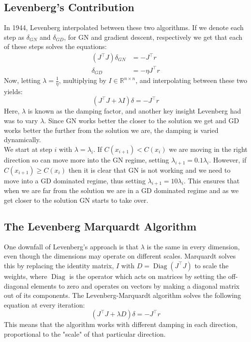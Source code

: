 \subsection{Levenberg's Contribution}\label{sec:background-lm}
In 1944, Levenberg \cite{levenberg1944} interpolated between these two algorithms. If we denote each step as $\delta_{GN}$ and $\delta_{GD}$, for GN and gradient descent, respectively we get that each of these steps solves the equations:
\begin{align}
  (J^\top J) \delta_{GN} &= - J^\top r \\
  \delta_{GD} &= -\eta J^\top r
\end{align}
Now, letting $\lambda = \frac{1}{\eta}$, multiplying by $I \in \mathbb{R}^{n \times n}$, and interpolating between these two yields:
\begin{equation}
  \label{eq:levenberg}
  \left(J^\top J + \lambda I \right)\delta = -J^\top r
\end{equation}
Here, $\lambda$ is known as the damping factor, and another key insight Levenberg had was to vary $\lambda$. Since GN works better the closer to the solution we get and GD works better the further from the solution we are, the damping is varied dynamically.\\
We start at step $i$ with $\lambda = \lambda_i$. If $C(x_{i+1}) < C(x_i)$ we are moving in the right direction so can move more into the GN regime, setting $\lambda_{i+1} = 0.1\lambda_i$. However, if $C(x_{i+1}) \geq C(x_{i})$ then it is clear that GN is not working and we need to move into a GD dominated regime, thus setting $\lambda_{i+1} = 10\lambda_{i}$. This ensures that when we are far from the solution we are in a GD dominated regime and as we get closer to the solution GN starts to take over.

\subsection{The Levenberg Marquardt Algorithm} 
One downfall of Levenberg's approach is that $\lambda$ is the same in every dimension, even though the dimensions may operate on different scales. Marquardt \cite{marquardt1963} solves this by replacing the identity matrix, $I$ with  $D = \operatorname{Diag}\left(J^\top J\right)$ to scale the weights, where $\operatorname{Diag}$ is the operator which acts on matrices by setting the off-diagonal elements to zero and operates on vectors by making a diagonal matrix out of its components. The Levenberg-Marquardt algorithm solves the following equation at every iteration:
\begin{equation}
  \label{eq:lm}
  \left(J^{\top}J + \lambda D \right)\delta = -J^{\top} r 
\end{equation}
This means that the algorithm works with different damping in each direction, proportional to the "scale" of that particular direction.

